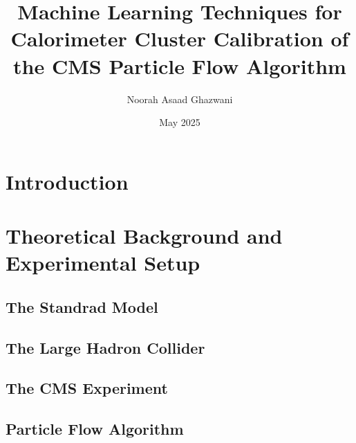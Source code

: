 \documentclass
[
]
{thesis}
\title{Machine Learning Techniques for Calorimeter Cluster Calibration of the CMS Particle Flow Algorithm}
\author{Noorah Asaad Ghazwani}
\date{May 2025}
\begin{document}

\setlength{\belowdisplayskip}{1ex} \setlength{\belowdisplayshortskip}{1ex}
\setlength{\abovedisplayskip}{1ex} \setlength{\abovedisplayshortskip}{1ex}


\chapter{Introduction}


\chapter{Theoretical Background and Experimental Setup}
\label{ch2}

%

\section{The Standrad Model}


\section{The Large Hadron Collider}


\section{The CMS Experiment}


\section{Particle Flow Algorithm}
 
\end{document}
